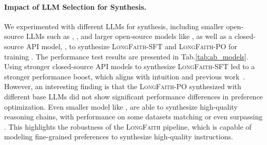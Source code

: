 \paragraph{Impact of LLM Selection for Synthesis.} We experimented with different LLMs for synthesis, including smaller open-source LLMs such as \textit{\llama}, \textit{\qwen}, and larger open-source models like \textit{\llamal}, as well as a closed-source API model, \textit{\gpt}, to synthesize \textsc{LongFaith}-SFT and \textsc{LongFaith}-PO for training \llama. The performance test results are presented in Tab.\ref{tab:ab_models}. Using stronger closed-source API models to synthesize \textsc{LongFaith}-SFT led to a stronger performance boost, which aligns with intuition and previous work~\cite{longmit}. However, an interesting finding is that the \textsc{LongFaith}-PO synthesized with different base LLMs did not show significant performance differences in preference optimization. Even smaller model like \textit{\qwen}, are able to synthesize high-quality reasoning chains, with performance on some datasets matching or even surpassing \textit{\gpt}. This highlights the robustness of the \textsc{LongFaith} pipeline, which is capable of modeling fine-grained preferences to synthesize high-quality instructions.